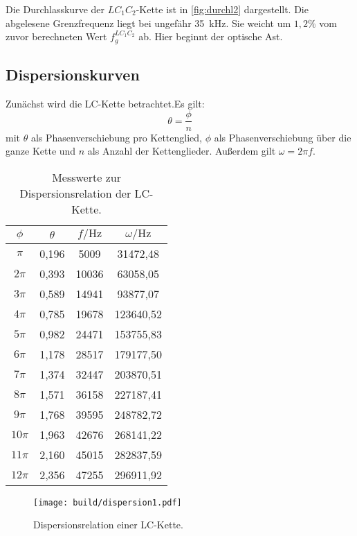 Die Durchlasskurve der $LC_1C_2$-Kette ist in \ref{fig:durchl2} dargestellt. Die abgelesene Grenzfrequenz liegt bei ungefähr \SI{35}{\kilo\hertz}. Sie weicht um $1,2\%$ vom zuvor berechneten Wert $f_g^{LC_1C_2}$ ab. Hier beginnt der optische Ast.

\subsection{Dispersionskurven}
Zunächst wird die LC-Kette betrachtet.Es gilt:
\begin{equation}
  \theta = \frac{\phi}{n}
\end{equation}
mit $\theta$ als Phasenverschiebung pro Kettenglied, $\phi$ als Phasenverschiebung über die ganze Kette und $n$ als Anzahl der Kettenglieder.
Außerdem gilt $\omega = 2\pi f$.

\begin{table}
  \centering
  \caption{Messwerte zur Dispersionsrelation der LC-Kette.}
  \label{tab:dispersion1}
  \begin{tabular}{c c c c}
    \toprule
    $\phi$ & $\theta$ & $f / \si{\hertz}$ & $\omega / \si{\hertz}$ \\
    \midrule
$\pi$ & 0,196 & 5009 & 31472,48 \\
$2\pi$ & 0,393 & 10036 & 63058,05 \\
$3\pi$ & 0,589 & 14941 & 93877,07 \\
$4\pi$ & 0,785 & 19678 & 123640,52 \\
$5\pi$ & 0,982 & 24471 & 153755,83 \\
$6\pi$ & 1,178 & 28517 & 179177,50 \\
$7\pi$ & 1,374 & 32447 & 203870,51 \\
$8\pi$ & 1,571 & 36158 & 227187,41 \\
$9\pi$ & 1,768 & 39595 & 248782,72 \\
$10\pi$ & 1,963 & 42676 & 268141,22 \\
$11\pi$ & 2,160 & 45015 & 282837,59 \\
$12\pi$ & 2,356 & 47255 & 296911,92 \\
\bottomrule
\end{tabular}
\end{table}

\begin{figure}
  \centering
  \texttt{[image: build/dispersion1.pdf]}
\caption{Dispersionsrelation einer LC-Kette.}
  \label{fig:dispersion-lc}
\end{figure}

